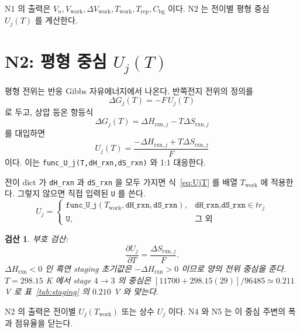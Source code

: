 \documentclass[11pt,a4paper]{article}
\newtheorem*{verifybox}{검산}
\newcommand{\bg}{\mathrm{bg}}
\newcommand{\work}{\mathrm{work}}
\newcommand{\rep}{\mathrm{rep}}
\begin{document}
N1 의 출력은 $V_n,V_{\work},\Delta V_{\work},T_{\work},T_{\rep},C_\bg$ 이다. N2 는 전이별 평형 중심 $U_j(T)$ 를 계산한다.

\section{N2: 평형 중심 $U_j(T)$}\label{sec:n2}
평형 전위는 반응 Gibbs 자유에너지에서 나온다. 반쪽전지 전위의 정의를
\begin{equation}
\Delta G_j(T)=-F\,U_j(T)
\label{eq:gibbsU}
\end{equation}
로 두고, 상압 등온 항등식
\begin{equation}
\Delta G_j(T)=\Delta H_{\mathrm{rxn},j}-T\Delta S_{\mathrm{rxn},j}
\label{eq:gibbsHS}
\end{equation}
를 대입하면
\begin{equation}
\boxed{\;U_j(T)=\frac{-\Delta H_{\mathrm{rxn},j}+T\Delta S_{\mathrm{rxn},j}}{F}\;}
\label{eq:UjT}
\end{equation}
이다. 이는 \texttt{func\_U\_j(T,dH\_rxn,dS\_rxn)} 와 1:1 대응한다.

전이 dict 가 \texttt{dH\_rxn} 과 \texttt{dS\_rxn} 을 모두 가지면 식~\eqref{eq:UjT} 를 배열 $T_{\work}$ 에 적용한다. 그렇지 않으면 직접 입력된 \texttt{U} 를 쓴다.
\begin{equation}
U_j=\begin{cases}
\texttt{func\_U\_j}(T_{\work},\texttt{dH\_rxn},\texttt{dS\_rxn}),&
\texttt{dH\_rxn,dS\_rxn}\in tr_j\\
\texttt{U},&\text{그 외}
\end{cases}
\label{eq:Uchoice}
\end{equation}

\begin{verifybox}
부호 검산:
\begin{equation}
\frac{\partial U_j}{\partial T}=\frac{\Delta S_{\mathrm{rxn},j}}{F}.
\label{eq:dUdT}
\end{equation}
$\Delta H_{\mathrm{rxn}}<0$ 인 흑연 staging 초기값은 $-\Delta H_{\mathrm{rxn}}>0$ 이므로 양의 전위 중심을 준다. $T=298.15$ K 에서 stage $4\to3$ 의 중심은 $[11700+298.15(29)]/96485\simeq0.211$ V 로 표~\ref{tab:staging} 의 $0.210$ V 와 맞는다.
\end{verifybox}

N2 의 출력은 전이별 $U_j(T_{\work})$ 또는 상수 $U_j$ 이다. N4 와 N5 는 이 중심 주변의 폭과 점유율을 닫는다.
\end{document}

